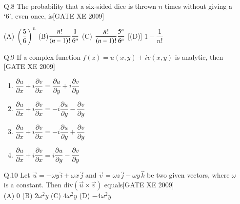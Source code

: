 \documentclass[journal,12pt,onecolumn]{IEEEtran}
\theoremstyle{remark}
\begin{document}
\begin{enumerate}
\begin{enumerate}
 \end{enumerate}   

\item[Q.8] The probability that a six-sided dice is thrown $n$ times without giving a `6', even once, is\hfill[GATE XE 2009]
    
        (A) $\left(\dfrac{5}{6}\right)^n$\hfill
        (B)$\dfrac{n!}{\left(n-1\right)!}\dfrac{1}{6^n}$\hfill
        (C) $\dfrac{n!}{\left(n-1\right)!}\dfrac{5^n}{6^n}$\hfill
        [(D)] $1 - \dfrac{1}{n!}$
    

\item[Q.9]If a complex function $f(z) = u(x, y) + i v(x, y)$ is analytic, then \hfill[GATE XE 2009]
      \begin{multicols}{2}
\begin{enumerate}
 

           \item     $\dfrac{\partial u}{\partial x} + i \dfrac{\partial v}{\partial x} = \dfrac{\partial u}{\partial y} + i \dfrac{\partial v}{\partial y}$ 
       \item  $\dfrac{\partial u}{\partial x} + i \dfrac{\partial v}{\partial x} = -i\dfrac{\partial u}{\partial y} - \dfrac{\partial v}{\partial y}$ 
         \item $\dfrac{\partial u}{\partial x} + i \dfrac{\partial v}{\partial x} = -i\dfrac{\partial u}{\partial y} + \dfrac{\partial v}{\partial y}$ 
        \item     $\dfrac{\partial u}{\partial x} + i \dfrac{\partial v}{\partial x} = i\dfrac{\partial u}{\partial y} - \dfrac{\partial v}{\partial y}$ 
    \end{enumerate}
 \end{multicols}

\item[Q.10] Let $\vec{u} = -\omega y\, \hat{i} + \omega x\, \hat{j}$ and $\vec{v} = \omega z\, \hat{j} - \omega y\, \hat{k}$ be two given vectors, where $\omega$ is a constant. Then $\mathrm{div} (\vec{u} \times \vec{v})$ equals\hfill[GATE XE 2009]\\
       (A) $0$\hfill
        (B) $2\omega^2 y$\hfill
        (C) $4\omega^2 y$\hfill
       (D) $-4\omega^2 y$\hfill
   


\end{enumerate}
\end{document}
